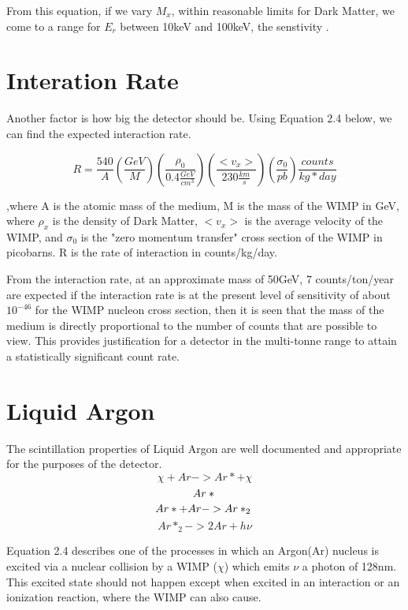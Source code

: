 \documentclass[11pt,a4paper,oneside]{report}
\begin{document}
From this equation, if we vary $M_x$, within reasonable limits for Dark Matter, we come to a range for $E_r$ between 10keV and 100keV, the senstivity .

\section{Interation Rate}
Another factor is how big the detector should be. Using Equation 2.4 below, we can find the expected interaction rate.

\begin{equation}
R = \frac{540}{A}\left(\frac{GeV}{M}\right)\left(\frac{\rho_0}{0.4\frac{GeV}{cm^3}}\right)\left(\frac{< v_x >}{230 \frac{km}{s}}\right)\left(\frac{\sigma_0}{pb}\right)\frac{counts}{kg*day}
\end{equation}

,where A is the atomic mass of the medium, M is the mass of the WIMP in GeV, where $\rho_x$ is the density of Dark Matter, $<v_x>$ is the average velocity of the WIMP, and $\sigma_0$ is the "zero momentum transfer" cross section of the WIMP in picobarns. R is the rate of interaction in counts/kg/day.

From the interaction rate, at an approximate mass of 50GeV, 7 counts/ton/year are expected if the interaction rate is at the present level of sensitivity of about $10^{-46}$ for the WIMP nucleon cross section, then it is seen that the mass of the medium is directly proportional to the number of counts that are possible to view. This provides justification for a detector in the multi-tonne range to attain a statistically significant count rate.

\section{Liquid Argon}

The scintillation properties of Liquid Argon are well documented\cite{13}\cite{14}\cite{15} and appropriate for the purposes of the detector.
\[
\chi	+Ar-> Ar* +\chi	
\]
\[
Ar*\\
\]\[
Ar*+Ar -> Ar*_2 \\
\]
\begin{equation}
Ar*_2 -> 2Ar +h\nu
\end{equation}

Equation 2.4 describes one of the processes in which an Argon(Ar) nucleus is excited via a nuclear collision by a WIMP ($\chi	$) which emits $\nu$ a photon of 128nm. This excited state should not happen except when excited in an interaction or an ionization reaction, where the WIMP can also cause.
\end{document}
